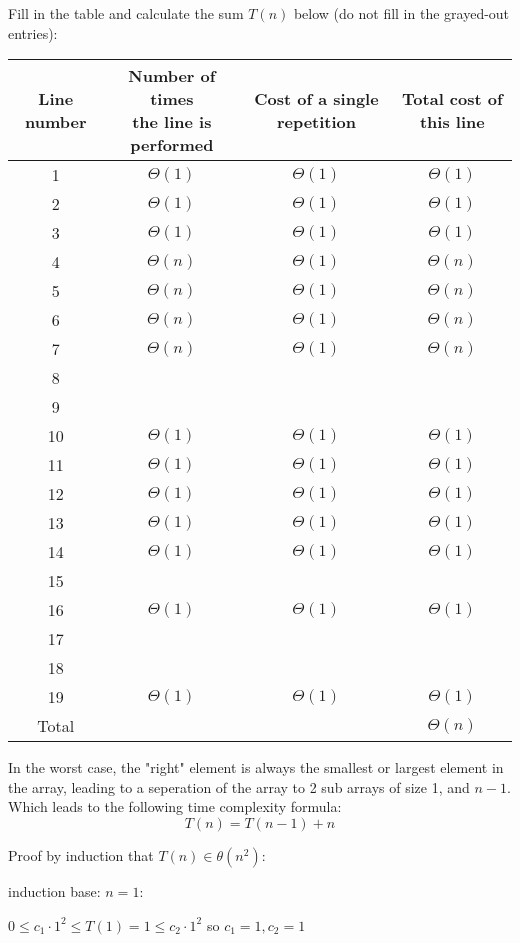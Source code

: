 \begin{answer}
    Fill in the table and calculate the sum $T(n)$ below (do not fill in the grayed-out entries):
\begin{center}    
\begin{tabular}{||c | c | c | c ||}
 \hline
 Line number & \makecell{Number of times \\ the line is performed} & Cost of a single repetition & Total cost of this line \\ [0.5ex]
 \hline\hline
 1 & $\Theta(1)$ & $\Theta(1)$ & $\Theta (1)$  \\
 \hline
 2 & $\Theta(1)$ & $\Theta(1)$ & $\Theta (1)$  \\
 \hline
 3 & $\Theta(1)$ & $\Theta(1)$ & $\Theta (1)$  \\
  \hline
 4 & $\Theta(n)$ & $\Theta(1)$ & $\Theta (n)$  \\
   \hline
 5 & $\Theta(n)$ & $\Theta(1)$ & $\Theta (n)$  \\
  \hline
 6 & $\Theta(n)$ & $\Theta(1)$ & $\Theta (n)$  \\
    \hline
 7 & $\Theta(n)$ & $\Theta(1)$ & $\Theta (n)$  \\
 \hline
 8 & \cellcolor{Gray} & \cellcolor{Gray} & \cellcolor{Gray} \\
 \hline
 9 & \cellcolor{Gray} & \cellcolor{Gray} & \cellcolor{Gray} \\
 \hline
 10 & $\Theta(1)$ & $\Theta(1)$ & $\Theta (1)$  \\
 \hline
 11 & $\Theta(1)$ & $\Theta(1)$ & $\Theta (1)$  \\
 \hline
 12 & $\Theta(1)$ & $\Theta(1)$ & $\Theta (1)$  \\
 \hline
 13 & $\Theta(1)$ & $\Theta(1)$ & $\Theta (1)$  \\
 \hline
 14 & $\Theta(1)$ & $\Theta(1)$ & $\Theta (1)$  \\
 \hline
 15 & \cellcolor{Gray} & \cellcolor{Gray} & \cellcolor{Gray} \\
 \hline
 16 & $\Theta(1)$ & $\Theta(1)$ & $\Theta (1)$  \\
 \hline
 17 & \cellcolor{Gray} & \cellcolor{Gray} & \cellcolor{Gray} \\
 \hline
 18 & \cellcolor{Gray} & \cellcolor{Gray} & \cellcolor{Gray} \\
 \hline
 19 & $\Theta(1)$ & $\Theta(1)$ & $\Theta (1)$  \\
 \hline
 Total & \cellcolor{Gray} & \cellcolor{Gray} & $\Theta (n)$  \\
 \hline
\end{tabular}
\end{center}
\item In the worst case, the "right" element is always the smallest or largest element in the array, leading to a seperation of the array to 2 sub arrays of size 1, and $n - 1$. Which leads to the following time complexity formula:
\[ T(n) = T(n-1) + n \]
\item Proof by induction that $ T(n) \in \theta(n^2)$:
\item induction base: $n = 1$:
\item $ 0 \leq c_1 \cdot 1^2 \leq T(1) = 1 \leq c_2 \cdot 1^2$ so $ c_1 = 1, c_2 = 1$


\end{answer}
